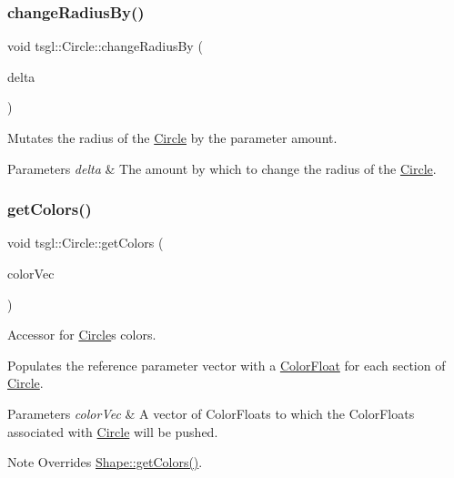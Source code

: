 \subsubsection{\texorpdfstring{change\+Radius\+By()}{changeRadiusBy()}}
{\footnotesize\ttfamily void tsgl\+::\+Circle\+::change\+Radius\+By (\begin{DoxyParamCaption}\item[{G\+Lfloat}]{delta }\end{DoxyParamCaption})}



Mutates the radius of the \hyperlink{classtsgl_1_1_circle}{Circle} by the parameter amount. 


\begin{DoxyParams}{Parameters}
{\em delta} & The amount by which to change the radius of the \hyperlink{classtsgl_1_1_circle}{Circle}. \\
\hline
\end{DoxyParams}
\mbox{\label{classtsgl_1_1_circle_af0e1ef7313bde5f66750b616de296f76}} 
\subsubsection{\texorpdfstring{get\+Colors()}{getColors()}}
{\footnotesize\ttfamily void tsgl\+::\+Circle\+::get\+Colors (\begin{DoxyParamCaption}\item[{std\+::vector$<$ \hyperlink{structtsgl_1_1_color_float}{Color\+Float} $>$ \&}]{color\+Vec }\end{DoxyParamCaption})\hspace{0.3cm}{\ttfamily [virtual]}}



Accessor for \hyperlink{classtsgl_1_1_circle}{Circle}\textquotesingle{}s colors. 

Populates the reference parameter vector with a \hyperlink{structtsgl_1_1_color_float}{Color\+Float} for each section of \hyperlink{classtsgl_1_1_circle}{Circle}. 
\begin{DoxyParams}{Parameters}
{\em color\+Vec} & A vector of Color\+Floats to which the Color\+Floats associated with \hyperlink{classtsgl_1_1_circle}{Circle} will be pushed. \\
\hline
\end{DoxyParams}
\begin{DoxyNote}{Note}
Overrides \hyperlink{classtsgl_1_1_shape_a6f54fe4d049f69a287edf8335a9509f8}{Shape\+::get\+Colors()}. 
\end{DoxyNote}


